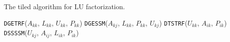 \documentclass{article}
\begin{document}
\begin{algorithm}[!h]
\caption{\label{alg:blklu}The tiled algorithm for LU factorization.}
  \begin{algorithmic}[1]
    \STATE \texttt{DGETRF}($A_{kk}$, $L_{kk}$, $U_{kk}$, $P_{kk}$)
    \STATE \texttt{DGESSM}($A_{kj}$, $L_{kk}$, $P_{kk}$, $U_{kj}$)
    \ENDFOR
    \STATE \texttt{DTSTRF}($U_{kk}$, $A_{ik}$, $P_{ik}$)
    \STATE \texttt{DSSSSM}($U_{kj}$, $A_{ij}$, $L_{ik}$, $P_{ik}$)
    \ENDFOR
    \ENDFOR
    \ENDFOR
  \end{algorithmic}
\end{algorithm}

\end{document}

